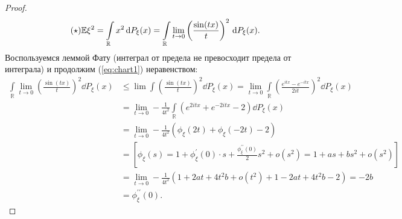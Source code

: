 \begin{proof}
\begin{equation*}\label{eq:chart1}\tag{$\star$}
    \EE \xi^2 = \int\limits_\mathbb{R}x^2\dd P_\xi(x) = \int\limits_\mathbb{R} \underset{t\rightarrow 0}{\lim}\left(\frac{\sin(tx)}{t}\right)^2\dd P_\xi(x). 
\end{equation*}
Воспользуемся леммой Фату (интеграл от предела не превосходит предела от интеграла) и продолжим (\ref{eq:chart1}) неравенством:
   \begin{align*}
        \int\limits_\mathbb{R}\underset{t\rightarrow 0}{\lim}(\frac{\sin(tx)}{t})^2\dd P_\xi(x) &\le \lim\int (\frac{\sin(tx)}{t})^2\dd P_\xi(x)=
        \underset{t\rightarrow 0}{\lim} \int\limits_\mathbb{R} (\frac{e^{itx} - e^{-itx}}{2it})^2\dd P_\xi(x) \\&=
        \underset{t\rightarrow 0}{\lim} - \frac{1}{4t^2}\int\limits_\mathbb{R}(e^{2itx} +e^{-2itx} - 2) \dd P_\xi(x) \\&=
        \underset{t\rightarrow 0}{\lim}-\frac{1}{4t^2}(\phi_\xi(2t) + \phi_\xi(-2t) - 2) \\&= [\phi_\xi(s) = 1 + \phi_\xi ^ \prime(0)\cdot s + \frac{\phi_\xi^{\prime \prime}(0)}{2}s^2 + o(s^2) = 1 + as + bs^2 + o(s^2)] \\&= \underset{t\rightarrow 0}{\lim} -\frac{1}{4t^2}(1 + 2at + 4t^2 b + o(t^2) + 1 - 2at + 4t^2b - 2) = -2b \\&= \phi_\xi^{\prime \prime}(0).
   \end{align*}


\end{proof}
